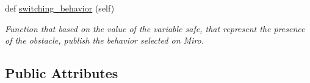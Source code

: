 \begin{DoxyCompactItemize}
\mbox{\label{classswitching__behavior__miro_1_1SwitchingBehavior_af98b244af11f28fd396ad9b518c270ff}} 
def \mbox{\hyperlink{classswitching__behavior__miro_1_1SwitchingBehavior_af98b244af11f28fd396ad9b518c270ff}{switching\+\_\+behavior}} (self)
\begin{DoxyCompactList}\small\item\em Function that based on the value of the variable safe, that represent the presence of the obstacle, publish the behavior selected on Miro. \end{DoxyCompactList}\end{DoxyCompactItemize}
\subsection*{Public Attributes}
